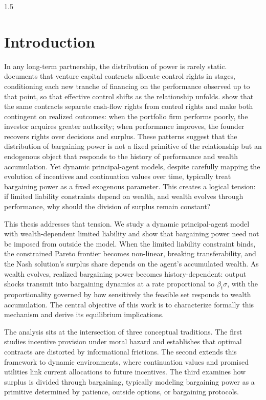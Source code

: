 \documentclass[12pt]{article}
\theoremstyle{definition}
\theoremstyle{plain}
\begin{document}
\begin{spacing}{1.5}
\newpage
{}
\section{Introduction}
In any long-term partnership, the distribution of power is rarely static. \textcite{gompers1995optimal} documents that venture capital contracts allocate control rights in stages, conditioning each new tranche of financing on the performance observed up to that point, so that effective control shifts as the relationship unfolds. \textcite{kaplan2003financial} show that the same contracts separate cash-flow rights from control rights and make both contingent on realized outcomes: when the portfolio firm performs poorly, the investor acquires greater authority; when performance improves, the founder recovers rights over decisions and surplus. These patterns suggest that the distribution of bargaining power is not a fixed primitive of the relationship but an endogenous object that responds to the history of performance and wealth accumulation. Yet dynamic principal-agent models, despite carefully mapping the evolution of incentives and continuation values over time, typically treat bargaining power as a fixed exogenous parameter. This creates a logical tension: if limited liability constraints depend on wealth, and wealth evolves through performance, why should the division of surplus remain constant?

This thesis addresses that tension. We study a dynamic principal-agent model with wealth-dependent limited liability and show that bargaining power need not be imposed from outside the model. When the limited liability constraint binds, the constrained Pareto frontier becomes non-linear, breaking transferability, and the Nash solution's surplus share depends on the agent's accumulated wealth. As wealth evolves, realized bargaining power becomes history-dependent: output shocks transmit into bargaining dynamics at a rate proportional to $\beta_t\sigma$, with the proportionality governed by how sensitively the feasible set responds to wealth accumulation. The central objective of this work is to characterize formally this mechanism and derive its equilibrium implications.

The analysis sits at the intersection of three conceptual traditions. The first studies incentive provision under moral hazard and establishes that optimal contracts are distorted by informational frictions. The second extends this framework to dynamic environments, where continuation values and promised utilities link current allocations to future incentives. The third examines how surplus is divided through bargaining, typically modeling bargaining power as a primitive determined by patience, outside options, or bargaining protocols.


\end{spacing}
\end{document}
